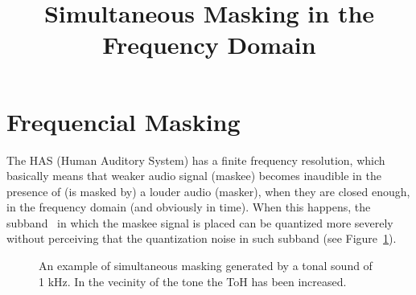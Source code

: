 

\title{Simultaneous Masking in the Frequency Domain}


\maketitle

\section{Frequencial Masking}
The HAS (Human Auditory System) has a finite frequency resolution,
which basically means that weaker audio signal (maskee) becomes
inaudible in the presence of (is masked by) a louder audio (masker),
when they are closed enough\cite{bosi2003intro}, in the frequency
domain (and obviously in time). When this happens, the
subband~\cite{vetterli1995wavelets} in which the maskee signal is
placed can be quantized more severely without perceiving that the
quantization noise in such subband (see Figure~\ref{fig:SM}).

\begin{figure}
  \centering
  \caption{An example of simultaneous masking generated by a tonal
    sound of 1 kHz. In the vecinity of the tone the ToH has been
    increased.}
  \label{fig:SM}
\end{figure}



